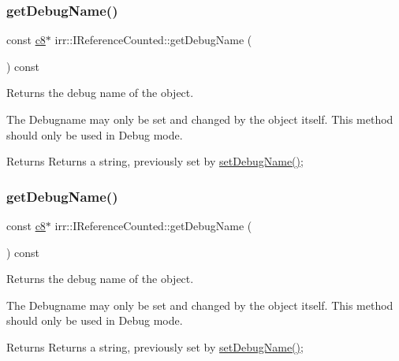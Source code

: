 \subsubsection{\texorpdfstring{get\+Debug\+Name()}{getDebugName()}\hspace{0.1cm}{\footnotesize\ttfamily [1/2]}}
{\footnotesize\ttfamily const \hyperlink{namespaceirr_a9395eaea339bcb546b319e9c96bf7410}{c8}$\ast$ irr\+::\+I\+Reference\+Counted\+::get\+Debug\+Name (\begin{DoxyParamCaption}{ }\end{DoxyParamCaption}) const\hspace{0.3cm}{\ttfamily [inline]}}



Returns the debug name of the object. 

The Debugname may only be set and changed by the object itself. This method should only be used in Debug mode. \begin{DoxyReturn}{Returns}
Returns a string, previously set by \hyperlink{classirr_1_1IReferenceCounted_a704c5042d399fe8cd3bdd65a0559002a}{set\+Debug\+Name()}; 
\end{DoxyReturn}
\mbox{\label{classirr_1_1IReferenceCounted_ad336c6e3c975e4c7911a606c27b894f0}} 
\subsubsection{\texorpdfstring{get\+Debug\+Name()}{getDebugName()}\hspace{0.1cm}{\footnotesize\ttfamily [2/2]}}
{\footnotesize\ttfamily const \hyperlink{namespaceirr_a9395eaea339bcb546b319e9c96bf7410}{c8}$\ast$ irr\+::\+I\+Reference\+Counted\+::get\+Debug\+Name (\begin{DoxyParamCaption}{ }\end{DoxyParamCaption}) const\hspace{0.3cm}{\ttfamily [inline]}}



Returns the debug name of the object. 

The Debugname may only be set and changed by the object itself. This method should only be used in Debug mode. \begin{DoxyReturn}{Returns}
Returns a string, previously set by \hyperlink{classirr_1_1IReferenceCounted_a704c5042d399fe8cd3bdd65a0559002a}{set\+Debug\+Name()}; 
\end{DoxyReturn}
\mbox{\label{classirr_1_1IReferenceCounted_ae9836f102c33c68068e74292e0a01819}} 
